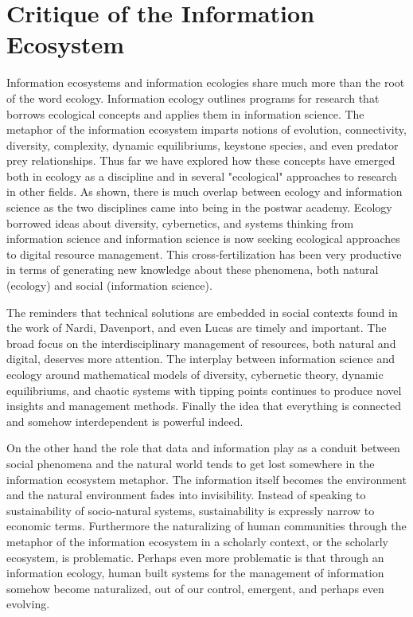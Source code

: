 \section{Critique of the Information Ecosystem}

Information ecosystems and information ecologies share much more than the root of the word ecology. Information ecology outlines programs for research that borrows ecological concepts and applies them in information science.  The metaphor of the information ecosystem imparts notions of evolution, connectivity, diversity, complexity, dynamic equilibriums, keystone species, and even predator prey relationships. Thus far we have explored how these concepts have emerged both in ecology as a discipline and in several "ecological" approaches to research in other fields. As shown, there is much overlap between ecology and information science as the two disciplines came into being in the postwar academy. Ecology borrowed ideas about diversity, cybernetics, and systems thinking from information science and information science is now seeking ecological approaches to digital resource management. This cross-fertilization has been very productive in terms of generating new knowledge about these phenomena, both natural (ecology) and social (information science). 

The reminders that technical solutions are embedded in social contexts found in the work of Nardi, Davenport, and even Lucas  are timely and important. The broad focus on the interdisciplinary management of resources, both natural and digital, deserves more attention. The interplay between information science and ecology around mathematical models of diversity, cybernetic theory, dynamic equilibriums, and chaotic systems with tipping points continues to produce novel insights and management methods. Finally the idea that everything is connected and somehow interdependent is powerful indeed.

On the other hand the role that data and information play as a conduit between social phenomena and the natural world tends to get lost somewhere in the information ecosystem metaphor. The information itself becomes the environment and the natural environment fades into invisibility. Instead of speaking to sustainability of socio-natural systems, sustainability is expressly narrow to economic terms. Furthermore the naturalizing of human communities through the metaphor of the information ecosystem in a scholarly context, or the scholarly ecosystem, is problematic. Perhaps even more problematic is that through an information ecology, human built systems for the management of information somehow become naturalized, out of our control, emergent, and perhaps even evolving.

